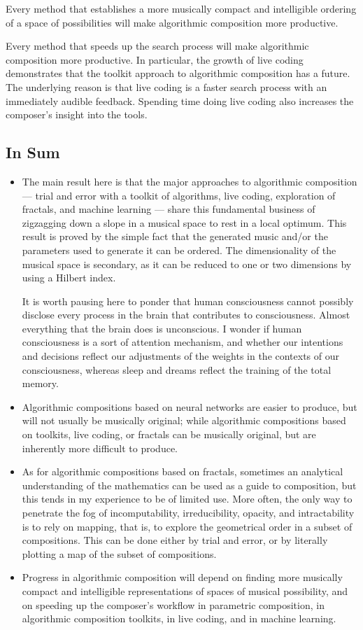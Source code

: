\documentclass[11pt]{scrartcl}
\begin{document}
Every method that establishes a more musically compact and intelligible ordering of a space of possibilities will make algorithmic composition more productive.

Every method that speeds up the search process will make algorithmic composition more productive. In particular, the growth of live coding demonstrates that the toolkit approach to algorithmic composition has a future. The underlying reason is that live coding is a faster search process with an immediately audible feedback. Spending time doing live coding also increases the composer's insight into the tools.

\subsection*{In Sum}

\begin{itemize}
\item The main result here is that the major approaches to algorithmic composition --- trial and error with a toolkit of algorithms, live coding, exploration of fractals, and machine learning --- share this fundamental business of zigzagging down a slope in a musical space to rest in a local optimum. This result is proved  by the simple fact that the generated music and/or the parameters used to generate it can be ordered. The dimensionality of the musical space is secondary, as it can be reduced to one or two dimensions by using a Hilbert index.

It is worth pausing here to ponder that human consciousness cannot possibly disclose every process in the brain that contributes to consciousness. Almost everything that the brain does is unconscious. I wonder if human consciousness is a sort of attention mechanism, and whether our intentions and decisions reflect our adjustments of the weights in the contexts of our consciousness, whereas sleep and dreams reflect the training of the total memory. 
\item Algorithmic compositions based on neural networks are easier to produce, but will not usually be musically original; while algorithmic compositions based on toolkits, live coding, or fractals can be musically original, but are inherently more difficult to produce.
\item As for algorithmic compositions based on fractals, sometimes an analytical understanding of the mathematics can be used as a guide to composition, but this tends in my experience to be of limited use. More often, the only way to penetrate the fog of incomputability, irreducibility, opacity, and intractability is to rely on mapping, that is, to explore the geometrical order in a subset of compositions. This can be done either by trial and error, or by literally plotting a map of the subset of compositions.
\item Progress in algorithmic composition will depend on finding more musically compact and intelligible representations of spaces of musical possibility, and on speeding up the composer's workflow in parametric composition, in algorithmic composition toolkits, in live coding, and in machine learning.
\end{itemize}
\end{document}
